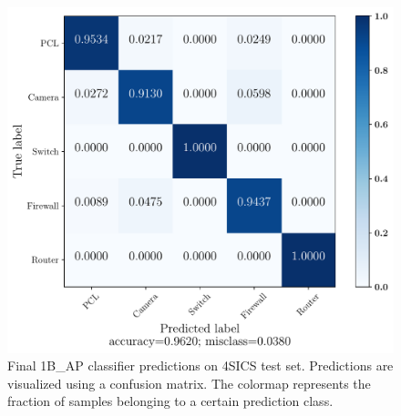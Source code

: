 %


\begin{figure}[!h]
\begin{minipage}{0.6\linewidth}
    \centering
        \includegraphics[width=\textwidth]{images/results/4SICS_clasf_20210613-174409__type_1branch__st_scale_sub__lb_100__act_elu__nf_16__ks_10__nn_50__l2_1e-05__bs_200__ep_300___cm.pdf}
\end{minipage}
\hfill
\begin{minipage}{0.29\linewidth}
\caption{Final 1B\_AP classifier predictions on 4SICS test set. Predictions are visualized using a confusion matrix.  The colormap represents the fraction of samples belonging to a certain prediction class.}
     \label{fig:4sics_results_cm}
\end{minipage}
\end{figure}



